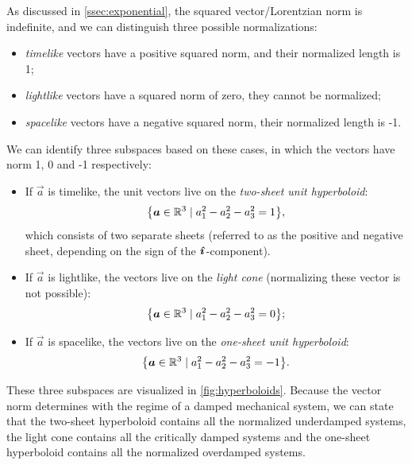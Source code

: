 As discussed in \cref{ssec:exponential}, the squared vector/Lorentzian norm is indefinite, and we can distinguish three possible normalizations:
\begin{itemize}
    \item \emph{timelike} vectors have a positive squared norm, and their normalized length is 1;
    \item \emph{lightlike} vectors have a squared norm of zero, they cannot be normalized;
    \item \emph{spacelike} vectors have a negative squared norm, their normalized length is -1.
\end{itemize}
We can identify three subspaces based on these cases, in which the vectors have norm 1, 0 and -1 respectively: 
\begin{itemize}
    \item If \(\vec{a}\) is timelike, the unit vectors live on the \emph{two-sheet unit hyperboloid}:
        \begin{equation}
     \qty{\vec{a} \in \real^3 \mid a_1^2 - a_2^2 - a_3^2 = 1},
\end{equation}
        which consists of two separate sheets (referred to as the positive and negative sheet, depending on the sign of the \(\quati\)-component).
    \item If \(\vec{a}\) is lightlike, the vectors live on the \emph{light cone} (normalizing these vector is not possible):
        \begin{equation}
     \qty{\vec{a} \in \real^3 \mid a_1^2 - a_2^2 - a_3^2 = 0};
\end{equation}
    \item If \(\vec{a}\) is spacelike, the vectors live on the \emph{one-sheet unit hyperboloid}:
        \begin{equation}
     \qty{\vec{a} \in \real^3 \mid a_1^2 - a_2^2 - a_3^2 = -1}.
\end{equation}
\end{itemize}
These three subspaces are visualized in \cref{fig:hyperboloids}. Because the vector norm determines with the regime of a damped mechanical system, we can state that the two-sheet hyperboloid contains all the normalized underdamped systems, the light cone contains all the critically damped systems and the one-sheet hyperboloid contains all the normalized overdamped systems.

